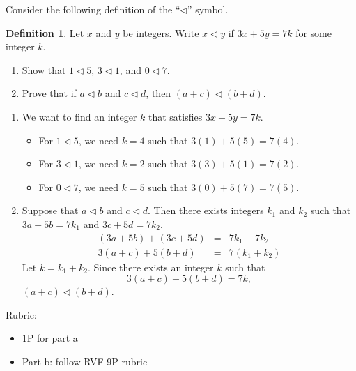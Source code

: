 \documentclass{article}
\theoremstyle{definition}
\newtheorem*{definition}{Definition}
\begin{document}
\begin{question}
    Consider the following definition of the ``$\triangleleft$'' symbol.
	\begin{definition}
	 Let $x$ and $y$ be integers. Write $x\triangleleft y$ if $3x+5y=7k$ for some integer $k$.
	\end{definition}
        \begin{enumerate}
           \item Show that $1\triangleleft 5$, $3\triangleleft 1$, and $0\triangleleft 7$.
           \item Prove that if $a\triangleleft b$ and $c\triangleleft d$, then $(a+c) \triangleleft (b+d)$.
        \end{enumerate}
\end{question}
\begin{solution}
    \begin{enumerate}
      \item We want to find an integer $k$ that satisfies $3x+5y=7k$.
	\begin{itemize}
	\item For $1\triangleleft 5$, we need $k=4$ such that $3(1)+5(5)=7(4)$.
	\item For $3\triangleleft 1$, we need $k=2$ such that $3(3)+5(1)=7(2)$.
	\item For $0\triangleleft 7$, we need $k=5$ such that $3(0)+5(7)=7(5)$.
	\end{itemize}
      \item Suppose that $a\triangleleft b$ and $c\triangleleft d$. Then there exists integers $k_1$ and $k_2$ such that $3a+5b=7k_1$ and $3c+5d=7k_2$.
	    \begin{eqnarray*}
	    (3a+5b) + (3c+5d) &=& 7k_1 + 7k_2\\
	    3(a+c) + 5(b + d) &=& 7(k_1+k_2)
	    \end{eqnarray*}
	Let $k=k_1+k_2$. Since there exists an integer $k$ such that 
	$$3(a+c) + 5(b + d)=7k,$$ $(a+c) \triangleleft (b+d)$.
    \end{enumerate}
    
{\color{red} Rubric:
\begin{itemize}
\item 1P for part a
\item Part b: follow RVF 9P rubric
\end{itemize}}
\end{solution}
\end{document}
